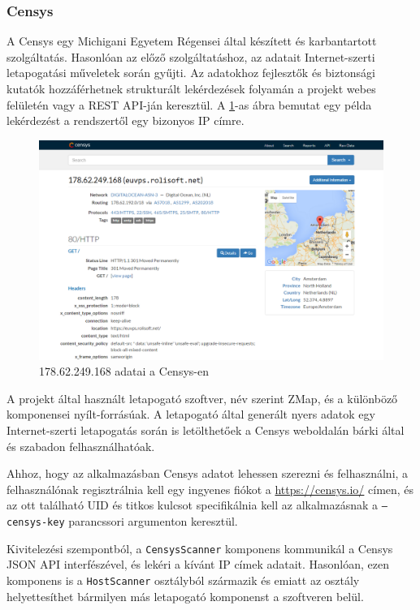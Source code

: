 \documentclass[a4paper,12pt]{article}
\begin{document}
\subsubsection{Censys} \label{ssec:censys}

	A Censys\cite{censys15} egy Michigani Egyetem Régensei által készített és karbantartott szolgáltatás. Hasonlóan az előző szolgáltatáshoz, az adatait Internet-szerti letapogatási műveletek során gyűjti. Az adatokhoz fejlesztők és biztonsági kutatók hozzáférhetnek strukturált lekérdezések folyamán a projekt webes felületén vagy a REST API-ján keresztül. A \ref{censysscr}-as ábra bemutat egy példa lekérdezést a rendszertől egy bizonyos IP címre.
	
	\begin{figure}[!htbp]
		\centering
		\includegraphics[scale=0.355]{censys.png}
		\caption{178.62.249.168 adatai a Censys-en}
		\label{censysscr}
	\end{figure}
	
	A projekt által használt letapogató szoftver, név szerint ZMap\cite{zmap13}, és a különböző komponensei nyílt-forrásúak. A letapogató által generált nyers adatok egy Internet-szerti letapogatás során is letölthetőek a Censys weboldalán bárki által és szabadon felhasználhatóak.
	
	Ahhoz, hogy az alkalmazásban Censys adatot lehessen szerezni és felhasználni, a felhasználónak regisztrálnia kell egy ingyenes fiókot a \url{https://censys.io/} címen, és az ott található UID és titkos kulcsot specifikálnia kell az alkalmazásnak a \texttt{--censys-key} parancssori argumenton keresztül.
	
	Kivitelezési szempontból, a \texttt{CensysScanner} komponens kommunikál a Censys JSON API interfészével, és lekéri a kívánt IP címek adatait. Hasonlóan, ezen komponens is a \texttt{HostScanner} osztályból származik és emiatt az osztály helyettesíthet bármilyen más letapogató komponenst a szoftveren belül.
\end{document}
